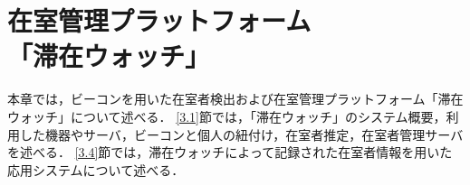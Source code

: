 \chapter{在室管理プラットフォーム\\「滞在ウォッチ」}\label{3}
本章では，ビーコンを用いた在室者検出および在室管理プラットフォーム「滞在ウォッチ」について述べる．
\ref{3.1}節では，「滞在ウォッチ」のシステム概要，利用した機器やサーバ，ビーコンと個人の紐付け，在室者推定，在室者管理サーバを述べる．
\ref{3.4}節では，滞在ウォッチによって記録された在室者情報を用いた応用システムについて述べる．



% 
% 

